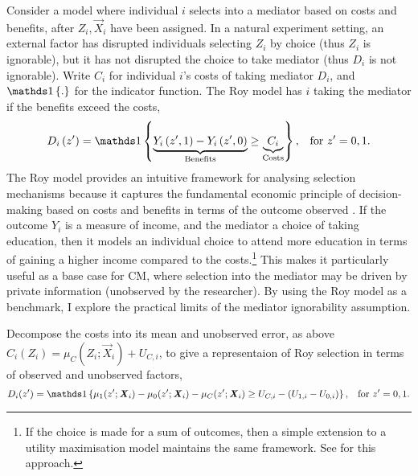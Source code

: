 Consider a model where individual $i$ selects into a mediator based on costs and benefits, after $Z_i, \vec X_i$ have been assigned.
In a natural experiment setting, an external factor has disrupted individuals selecting $Z_i$ by choice (thus $Z_i$ is ignorable), but it has not disrupted the choice to take mediator (thus $D_i$ is not ignorable).
Write $C_i$ for individual $i$'s costs of taking mediator $D_i$, and $\indicator{.}$ for the indicator function.
The Roy model has $i$ taking the mediator if the benefits exceed the costs,
\begin{equation}
    \label{eqn:roy-model}
    D_i \left( z' \right) = \indicator{
    \underbrace{Y_i\left( z', 1 \right) - Y_i\left( z', 0 \right)}_{\text{Benefits}}
    \geq \underbrace{C_i}_{\text{Costs}}}, \;\;\; \text{for } z'=0,1.
\end{equation}
The Roy model provides an intuitive framework for analysing selection mechanisms because it captures the fundamental economic principle of decision-making based on costs and benefits in terms of the outcome observed \citep{roy1951some,heckman1990empirical}.
If the outcome $Y_i$ is a measure of income, and the mediator a choice of taking education, then it models an individual choice to attend more education in terms of gaining a higher income compared to the costs.\footnote{
    If the choice is made for a sum of outcomes, then a simple extension to a utility maximisation model maintains the same framework.
    See \cite{heckman1990empirical} for this approach.
}
This makes it particularly useful as a base case for CM, where selection into the mediator may be driven by private information (unobserved by the researcher).
By using the Roy model as a benchmark, I explore the practical limits of the mediator ignorability assumption.

Decompose the costs into its mean and unobserved error, as above $C_i(Z_i) = \mu_{C}(Z_i; \vec X_i) + U_{C,i}$, to give a representaion of Roy selection in terms of observed and unobserved factors,
\[ D_i(z') = \indicator{
    \mu_1(z'; \vec X_i) - \mu_0(z'; \vec X_i) - \mu_C(z'; \vec X_i)
    \geq U_{C,i} - \left(U_{1,i} - U_{0,i}\right) }
        , \;\;\; \text{for } z'=0,1. \]

